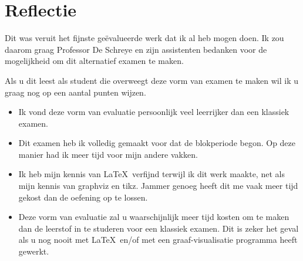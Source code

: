 \documentclass[alternative-exam.tex]{subfiles}
\begin{document}
\chapter*{Reflectie}
Dit was veruit het fijnste ge\"evalueerde werk dat ik al heb mogen doen. Ik zou daarom graag Professor De Schreye en zijn assistenten bedanken voor de mogelijkheid om dit alternatief examen te maken.

\noindent Als u dit leest als student die overweegt deze vorm van examen te maken wil ik u graag nog op een aantal punten wijzen.
\begin{itemize}
\item Ik vond deze vorm van evaluatie persoonlijk veel leerrijker dan een klassiek examen.
\item Dit examen heb ik volledig gemaakt voor dat de blokperiode begon. Op deze manier had ik meer tijd voor mijn andere vakken.
\item Ik heb mijn kennis van \LaTeX\ verfijnd terwijl ik dit werk maakte, net als mijn kennis van graphviz en tikz. Jammer genoeg heeft dit me vaak meer tijd gekost dan de oefening op te lossen.
\item Deze vorm van evaluatie zal u waarschijnlijk meer tijd kosten om te maken dan de leerstof in te studeren voor een klassiek examen. Dit is zeker het geval als u nog nooit met \LaTeX\ en/of met een graaf-visualisatie programma heeft gewerkt.
\end{itemize}
\end{document}
